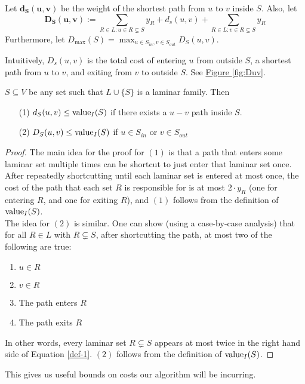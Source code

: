 \begin{definition} Let $\bm{d_S(u,v)}$ be the weight of the shortest path from $u$ to $v$ inside $S$. Also, let \begin{equation}\bm{D_S(u,v)}:=\sum_{R\in L : u\in R\subsetneq S}y_R + d_s(u,v) + \sum_{R\in L : v\in R\subsetneq S}y_R\label{def-1}\end{equation}
	Furthermore, let $D_{\max}(S) = \max_{u \in S_{in}, v \in S_{out}}D_S(u,v)$.
\end{definition}

Intuitively, $D_s(u,v)$ is the total cost of entering $u$ from outside $S$, a shortest path from $u$ to $v$, and exiting from $v$ to outside $S$. See \hyperref[fig:Duv]{Figure \ref{fig:Duv}}.\vspace{2mm}
\begin{lemma}\label{lemm:2:D-val} $S\subseteq V$ be any set such that $L\cup \{S\}$ is a laminar family. Then\begin{enumerate}
	\item[(1)] $d_S(u,v)\leq \textup{value}_I(S)$ if there exists a $u-v$ path inside $S$.
	\item[(2)] $D_S(u,v)\leq \textup{value}_I(S)$ if $u\in S_{in}$ or $v\in S_{out}$
	\end{enumerate}
\end{lemma}
\begin{proof}
	The main idea for the proof for $(1)$ is that a path that enters some laminar set multiple times can be shortcut to just enter that laminar set once. After repeatedly shortcutting until each laminar set is entered at most once, the cost of the path that each set $R$ is responsible for is at most $2\cdot y_R$ (one for entering $R$, and one for exiting $R$), and $(1)$ follows from the definition of $\textup{value}_I(S)$.\vspace{2mm}
	\\The idea for $(2)$ is similar. One can show (using a case-by-case analysis) that for all $R\in L$ with $R\subsetneq S$, after shortcutting the path, at most two of the following are true:
	\begin{enumerate}
		\item $u\in R$
		\item $v\in R$
		\item The path enters $R$
		\item The path exits $R$
	\end{enumerate}
	In other words, every laminar set $R\subsetneq S$ appears at most twice in the right hand side of Equation \ref{def-1}. $(2)$ follows from the definition of $\textup{value}_I(S)$.
\end{proof}\vspace{2mm}
This gives us useful bounds on costs our algorithm will be incurring.

